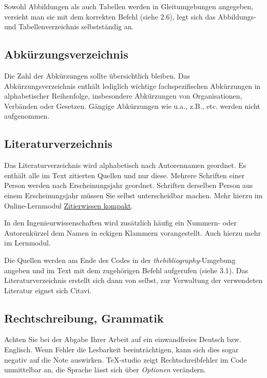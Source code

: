 \documentclass[a4paper,11pt]{article}%
\renewcommand{\\}{\vspace*{0.5\baselineskip} \newline}
\begin{document}
Sowohl Abbildungen als auch Tabellen werden in Gleitumgebungen angegeben, versieht man sie mit dem korrekten Befehl (siehe 2.6), legt sich das Abbildungs- und Tabellenverzeichnis selbstständig an. 



\subsection{Abkürzungsverzeichnis}

Die Zahl der Abkürzungen sollte übersichtlich bleiben. Das Abkürzungsverzeichnis enthält lediglich wichtige fachspezifischen Abkürzungen in alphabetischer Reihenfolge, insbesondere Abkürzungen von Organisationen, Verbänden oder Gesetzen. Gängige Abkürzungen wie u.a., z.B., etc. werden nicht aufgenommen.



\subsection{Literaturverzeichnis}

Das Literaturverzeichnis wird alphabetisch nach Autorennamen geordnet. Es enthält alle im Text zitierten Quellen und nur diese. Mehrere Schriften einer Person werden nach Erscheinungsjahr geordnet. Schriften derselben Person aus einem Erscheinungsjahr müssen Sie selbst unterscheidbar machen. Mehr hierzu im Online-Lernmodul \href{https://ilias.th-koeln.de/ilias.php?baseClass=ilRepositoryGUI}{\underline{Zitierwissen kompakt}}.\\

In den Ingenieurwissenschaften wird zusätzlich häufig ein Nummern- oder Autorenkürzel dem Namen in eckigen Klammern vorangestellt. Auch hierzu mehr im Lernmodul.\\

Die Quellen werden am Ende des Codes in der \textit{thebibliography}-Umgebung angeben und im Text mit dem zugehörigen Befehl aufgerufen (siehe 3.1). Das Literaturverzeichnis erstellt sich dann von selbst, zur Verwaltung der verwendeten Literatur eignet sich Citavi.



\subsection{Rechtschreibung, Grammatik}

Achten Sie bei der Abgabe Ihrer Arbeit auf ein einwandfreies Deutsch bzw. Englisch. Wenn Fehler die Lesbarkeit beeinträchtigen, kann sich dies sogar negativ auf die Note auswirken. \TeX -studio zeigt Rechtschreibfehler im Code unmittelbar an, die Sprache lässt sich über \textit{Optionen} verändern.\\
\end{document}

